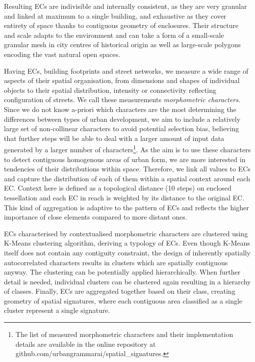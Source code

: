 Resulting ECs are indivisible and internally consistent, as they are very granular and
linked at maximum to a single building, and exhaustive as they cover entirety of space
thanks to contiguous geometry of enclosures. Their structure and scale adapts to the
environment and can take a form of a small-scale granular mesh in city centres of
historical origin as well as large-scale polygons encoding the vast natural open spaces.

Having ECs, building footprints and street networks, we measure a wide range of aspects
of their spatial organisation, from dimensions and shapes of individual objects to their
spatial distribution, intensity or connectivity reflecting configuration of streets. We
call these measurements \textit{morphometric characters}. Since we do not know a-priori
which characters are the most determining the differences between types of urban
development, we aim to include a relatively large set of non-collinear characters to
avoid potential selection bias, believing that further steps will be able to deal with a
larger amount of input data generated by a larger number of characters\footnote{The list
of measured morphometric characters and their implementation details are available in
the online repository at github.com/urbangrammarai/spatial_signatures.}. As the aim is
to use these characters to detect contiguous homogenous areas of urban form, we are more
interested in tendencies of their distributions within space. Therefore, we link all
values to ECs and capture the distribution of each of them within a spatial context
around each EC. Context here is defined as a topological distance (10 steps) on enclosed
tessellation and each EC in reach is weighted by its distance to the original EC. This
kind of aggregation is adaptive to the pattern of ECs and reflects the higher importance
of close elements compared to more distant ones.

ECs characterised by contextualised morphometric characters are clustered using K-Means
clustering algorithm, deriving a typology of ECs. Even though K-Means itself does not
contain any contiguity constraint, the design of inherently spatially autocorrelated
characters results in clusters which are spatially contiguous anyway. The clustering can
be potentially applied hierarchically. When further detail is needed, individual
clusters can be clustered again resulting in a hierarchy of classes. Finally, ECs are
aggregated together based on their class, creating geometry of spatial signatures, where
each contiguous area classified as a single cluster represent a single signature.

